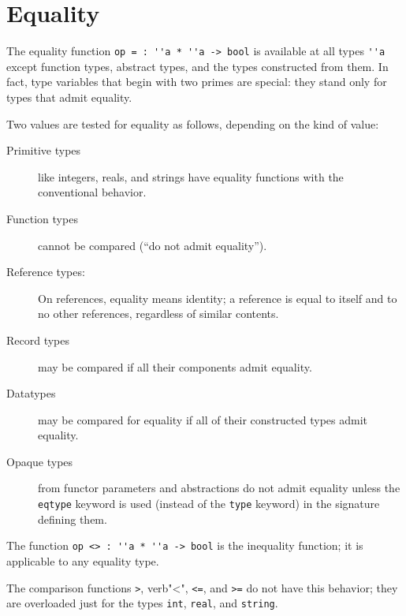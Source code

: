 \chapter{Equality}

The equality function \verb"op = : ''a * ''a -> bool" is available at
all types \verb"''a" except function types, abstract types, and the
types constructed from them.  In fact, type variables that begin
with two primes are special: they stand only for types that admit
equality.

Two values are tested for equality as follows, depending on the kind
of value:
\begin{description}
\item[Primitive types] like integers, reals, and strings have
equality functions with the conventional behavior.

\item[Function types] cannot be compared (``do not admit equality'').

\item[Reference types:] On references, equality means identity; a
reference is equal to itself and to no other references, regardless
of similar contents.

\item[Record types] may be compared if all their components admit equality.

\item[Datatypes] may be compared for equality if all of their
constructed types admit equality.

\item[Opaque types] from functor parameters and abstractions do not
admit equality unless the \verb"eqtype" keyword is used (instead of
the \verb"type" keyword) in the
signature defining them.
\end{description}

The function \verb"op <> : ''a * ''a -> bool" is the inequality function;
it is applicable to any equality type.

The comparison functions \verb">", verb"<", \verb"<=", and \verb">=" do not
have this behavior; they are overloaded just for the types
\verb"int", \verb"real", and \verb"string".
